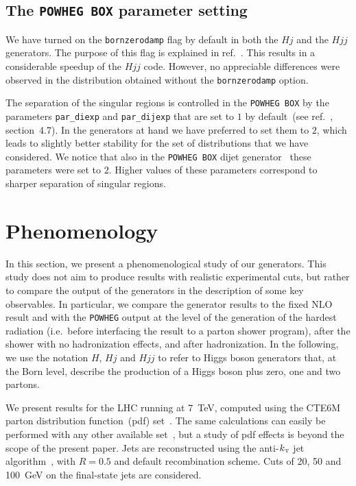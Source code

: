 \documentclass[paper]{JHEP3}
\newcommand\sss{\mathchoice%
{\displaystyle}%
{\scriptstyle}%
{\scriptscriptstyle}%
{\scriptscriptstyle}%
}
\newcommand\kt{k_{\sss\rm T}}
\newcommand\POWHEG{{\tt POWHEG}}
\newcommand\POWHEGBOX{{\tt POWHEG BOX}}
\begin{document}
\subsection{The \POWHEGBOX{} parameter setting}
We have turned on the {\tt bornzerodamp} flag by default in both the $Hj$ and
the $Hjj$ generators. The purpose of this flag is explained in
ref.~\cite{Alioli:2010xd}.  This results in a considerable speedup of the
$Hjj$ code.  However, no appreciable differences were observed in the
distribution obtained without the {\tt bornzerodamp} option.

The separation of the singular regions is controlled in the \POWHEGBOX{} by
the parameters {\tt par\_diexp} and {\tt par\_dijexp} that are set to $1$ by
default~(see ref.~\cite{Alioli:2010xd}, section~4.7).  In the generators at
hand we have preferred to set them to $2$, which leads to slightly better
stability for the set of distributions that we have considered. We notice
that also in the \POWHEGBOX{} dijet generator~\cite{Alioli:2010xa} these
parameters were set to $2$. Higher values of these parameters correspond to
sharper separation of singular regions.

\section{Phenomenology}
\label{sec:phenomenology}
In this section, we present a phenomenological study of our generators. This
study does not aim to produce results with realistic experimental cuts, but
rather to compare the output of the generators in the description of some key
observables. In particular, we compare the generator results to the fixed NLO
result and with the \POWHEG{} output at the level of the generation of the
hardest radiation (i.e.~before interfacing the result to a
parton shower program), after the shower with no hadronization effects,
and after hadronization.  In the following, we use the notation $H$, $Hj$ and
$Hjj$ to refer to Higgs boson generators that, at the Born level, describe
the production of a Higgs boson plus zero, one and two partons.

We present results for the LHC running at 7~TeV, computed using the CTE6M
parton distribution function~(pdf) set~\cite{Pumplin:2002vw}. 
The same calculations can
easily be performed with any other available set~\cite{Martin:2009iq,Ball:2008by}, but a
study of pdf effects is beyond the scope of the present paper.  Jets are
reconstructed using the anti-$\kt$ jet algorithm~\cite{Cacciari:2008gp}, 
with $R=0.5$ and
default recombination scheme. Cuts of 20, 50 and 100~GeV on the final-state
jets are considered.
\end{document}
